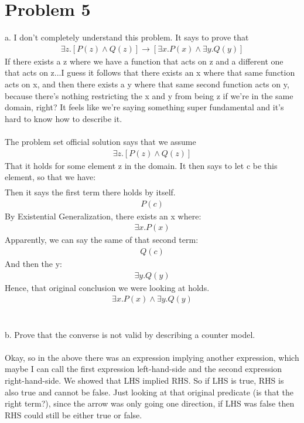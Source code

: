 \documentclass{article}
\begin{document}
\section{Problem 5}
a. I don't completely understand this problem. It says to prove that 
\begin {align*}
\exists z. [P(z) \wedge Q(z)] \rightarrow [\exists x. P(x) \wedge \exists y. Q(y)]
\end {align*}
If there exists a z where we have a function that acts on z and a different one that acts on z...I guess it follows that there exists an x where that same function acts on x, and then there exists a y where that same second function acts on y, because there's nothing restricting the x and y from being z if we're in the same domain, right? It feels like we're saying something super fundamental and it's hard to know how to describe it.
\\
\\
The problem set official solution says that we assume 
\begin {align*}
\exists z. [P(z) \wedge Q(z)]
\end {align*}
That it holds for some element z in the domain. It then says to let c be this element, so that we have:
\begin {align*}
[P(c) \wedge Q(c)]
\end {align*}
Then it says the first term there holds by itself. 
\begin {align*}
P(c)
\end {align*}
By Existential Generalization, there exists an x where:
\begin {align*}
\exists x. P(x)
\end {align*}
Apparently, we can say the same of that second term:
\begin {align*}
Q(c)
\end {align*}
And then the y:
\begin {align*}
\exists y. Q(y)
\end {align*}
Hence, that original conclusion we were looking at holds. 
\begin {align*}
\exists x. P(x) \wedge \exists y. Q(y)
\end {align*}
\\
\\
b. Prove that the converse is not valid by describing a counter model. 
\\
\\
Okay, so in the above there was an expression implying another expression, which maybe I can call the first expression left-hand-side and the second expression right-hand-side. We showed that LHS implied RHS. So if LHS is true, RHS is also true and cannot be false. Just looking at that original predicate (is that the right term?), since the arrow was only going one direction, if LHS was false then RHS could still be either true or false. 
\end{document}
